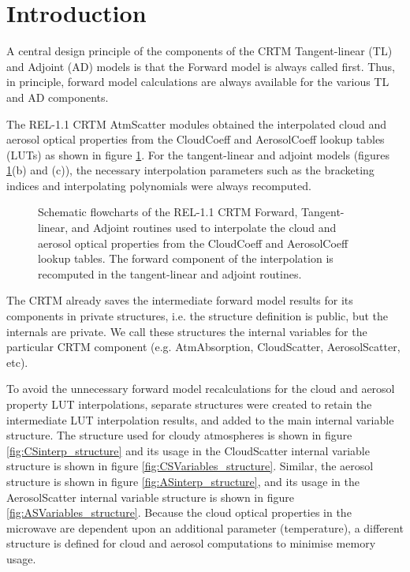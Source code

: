 \section{Introduction}
A central design principle of the components of the CRTM Tangent-linear (TL) and Adjoint (AD) models is that the Forward model is always called first. Thus, in principle, forward model calculations are always available for the various TL and AD components.

The REL-1.1 CRTM AtmScatter modules obtained the interpolated cloud and aerosol optical properties from the CloudCoeff and AerosolCoeff lookup tables (LUTs) as shown in figure \ref{fig:AtmScatter_Interpolation}. For the tangent-linear and adjoint models (figures \ref{fig:AtmScatter_Interpolation}(b) and (c)), the necessary interpolation parameters such as the bracketing indices and interpolating polynomials were always recomputed.
 
\begin{figure}[htp]
  \centering
  
  \caption{Schematic flowcharts of the REL-1.1 CRTM Forward, Tangent-linear, and Adjoint routines used to interpolate the cloud and aerosol optical properties from the CloudCoeff and AerosolCoeff lookup tables. The forward component of the interpolation is recomputed in the tangent-linear and adjoint routines.}
  \label{fig:AtmScatter_Interpolation}
\end{figure}

The CRTM already saves the intermediate forward model results for its components in private structures, i.e. the structure definition is public, but the internals are private. We call these structures the internal variables for the particular CRTM component (e.g. AtmAbsorption, CloudScatter, AerosolScatter, etc).

To avoid the unnecessary forward model recalculations for the cloud and aerosol property LUT interpolations, separate structures were created to retain the intermediate LUT interpolation results, and added to the main internal variable structure. The structure used for cloudy atmospheres is shown in figure \ref{fig:CSinterp_structure} and its usage in the CloudScatter internal variable structure is shown in figure \ref{fig:CSVariables_structure}. Similar, the aerosol structure is shown in figure \ref{fig:ASinterp_structure}, and its usage in the AerosolScatter internal variable structure is shown in figure \ref{fig:ASVariables_structure}. Because the cloud optical properties in the microwave are dependent upon an additional parameter (temperature), a different structure is defined for cloud and aerosol computations to minimise memory usage.

